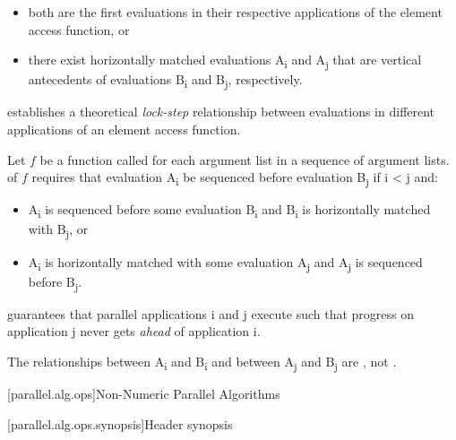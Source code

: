 \begin{itemize}
\item both are the first evaluations in their respective applications of the element access function, or
\item there exist horizontally matched evaluations A\textsubscript{i} and A\textsubscript{j} that are vertical antecedents of evaluations B\textsubscript{i} and B\textsubscript{j}, respectively.
\end{itemize}

\begin{note} establishes a theoretical \emph{lock-step} relationship between evaluations in different applications of an element access function.\end{note}

\pnum
Let $f$ be a function called for each argument list in a sequence of argument lists.  of $f$ requires that evaluation A\textsubscript{i} be sequenced before evaluation B\textsubscript{j} if i < j and:

\begin{itemize}
\item A\textsubscript{i} is sequenced before some evaluation B\textsubscript{i} and B\textsubscript{i} is horizontally matched with B\textsubscript{j}, or
\item A\textsubscript{i} is horizontally matched with some evaluation A\textsubscript{j} and A\textsubscript{j} is sequenced before B\textsubscript{j}.
\end{itemize}

\begin{note}
 guarantees that parallel applications i and j execute such that progress on application j never gets \emph{ahead} of application i.
\end{note}
\begin{note}
The relationships between A\textsubscript{i} and B\textsubscript{i} and between A\textsubscript{j} and B\textsubscript{j} are , not .
\end{note}

[parallel.alg.ops]{Non-Numeric Parallel Algorithms}

[parallel.alg.ops.synopsis]{Header  synopsis}

